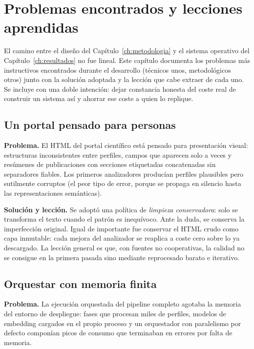 \chapter[Lecciones aprendidas]{Problemas encontrados y lecciones \texorpdfstring{\\}{ }aprendidas}
\label{ch:lecciones}

El camino entre el diseño del Capítulo~\ref{ch:metodologia} y el sistema operativo del Capítulo~\ref{ch:resultados} no fue lineal.
Este capítulo documenta los problemas más instructivos encontrados durante el desarrollo (técnicos unos, metodológicos otros) junto con la solución adoptada y la lección que cabe extraer de cada uno.
Se incluye con una doble intención: dejar constancia honesta del coste real de construir un sistema así y ahorrar ese coste a quien lo replique.

\section{Un portal pensado para personas}
\label{sec:lec-portal}

\textbf{Problema.}
El HTML del portal científico está pensado para presentación visual: estructuras inconsistentes entre perfiles, campos que aparecen solo a veces y resúmenes de publicaciones con secciones etiquetadas concatenadas sin separadores fiables.
Los primeros analizadores producían perfiles plausibles pero sutilmente corruptos (el peor tipo de error, porque se propaga en silencio hasta las representaciones semánticas).

\textbf{Solución y lección.}
Se adoptó una política de \emph{limpieza conservadora}: solo se transforma el texto cuando el patrón es inequívoco.
Ante la duda, se conserva la imperfección original.
Igual de importante fue conservar el HTML crudo como capa inmutable: cada mejora del analizador se reaplica a coste cero sobre lo ya descargado.
La lección general es que, con fuentes no cooperativas, la calidad no se consigue en la primera pasada sino mediante reprocesado barato e iterativo.

\section{Orquestar con memoria finita}
\label{sec:lec-airflow}

\textbf{Problema.}
La ejecución orquestada del pipeline completo agotaba la memoria del entorno de despliegue: fases que procesan miles de perfiles, modelos de embedding cargados en el propio proceso y un orquestador con paralelismo por defecto componían picos de consumo que terminaban en errores por falta de memoria.

